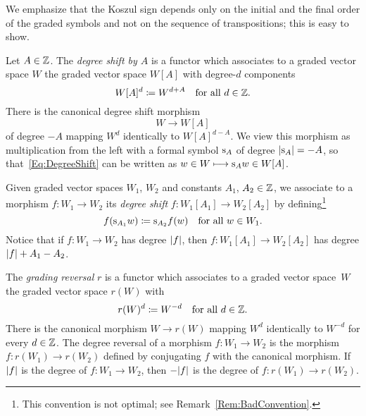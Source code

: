 \documentclass[\MainFolder/Text.tex]{subfiles}
\begin{document}
We emphasize that the Koszul sign depends only on the initial and the final order of the graded symbols and not on the sequence of transpositions; this is easy to show.



\begin{Definition}\label{Def:DegreeShift}
Let $A\in \mathbb{Z}$. The \emph{degree shift by $A$} is a functor which associates to a graded vector space $W$ the graded vector space $W[A]$ with degree-$d$ components
\[ W[A]^d \coloneqq W^{d+A}\quad \text{for all }d\in \mathbb{Z}.\]%
There is the canonical degree shift morphism 
\begin{equation}\label{Eq:DegreeShift}
 W\longrightarrow W[A]
\end{equation}
of degree $-A$ mapping $W^d$ identically to $W[A]^{d-A}$. We view this morphism as multiplication from the left with a formal symbol $\mathrm{s}_A$ of degree $|\mathrm{s}_A|=-A$, so that~\eqref{Eq:DegreeShift} can be written as $w\in W \longmapsto \mathrm{s}_A w\in W[A]$.

Given graded vector spaces $W_1$, $W_2$ and constants $A_1$, $A_2\in \mathbb{Z}$, we associate to a morphism $f: W_1 \rightarrow W_2$ its \emph{degree shift} $f: W_1[A_1] \rightarrow W_2[A_2]$ by defining\footnote{This convention is not optimal; see Remark~\ref{Rem:BadConvention}.}
\begin{equation}\label{Eq:DegreeShiftConv}
f(\mathrm{s}_{A_1} w) \coloneqq \mathrm{s}_{A_2} f(w)\quad\text{for all } w \in W_1.
\end{equation} 
Notice that if $f:W_1 \rightarrow W_2$ has degree $|f|$, then $f: W_1[A_1] \rightarrow W_2[A_2]$ has degree $|f| + A_1 - A_2$.

The \emph{grading reversal} $r$ is a functor which associates to a graded vector space~$W$ the graded vector space $r(W)$ with
\[ r(W)^d \coloneqq W^{-d}\quad\text{for all }d\in \mathbb{Z}. \]
There is the canonical morphism $W\rightarrow r(W)$ mapping $W^d$ identically to $W^{-d}$ for every $d\in \mathbb{Z}$. The degree reversal of a morphism $f: W_1 \rightarrow W_2$ is the morphism $f: r(W_1) \rightarrow  r(W_2)$ defined by conjugating $f$ with the canonical morphism. If $|f|$ is the degree of $f: W_1 \rightarrow W_2$, then $-|f|$ is the degree of $f: r(W_1) \rightarrow  r(W_2)$.
\end{Definition}
\end{document}
